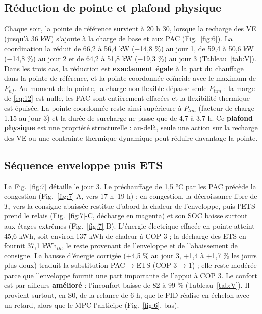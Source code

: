 \documentclass[conference]{IEEEtran}
\begin{document}
\subsection{Réduction de pointe et plafond physique}

Chaque soir, la pointe de référence survient à 20 h 30, lorsque la recharge des VE (jusqu'à 36 kW) s'ajoute à la charge de base et aux PAC (Fig.~\ref{fig:6}). La coordination la réduit de 66,2 à 56,4 kW (−14,8 \%) au jour 1, de 59,4 à 50,6 kW (−14,8 \%) au jour 2 et de 64,2 à 51,8 kW (−19,3 \%) au jour 3 (Tableau~\ref{tab:V}). Dans les trois cas, la réduction est \textbf{exactement égale} à la part du chauffage dans la pointe de référence, et la pointe coordonnée coïncide avec le maximum de \(P_{nf}\). Au moment de la pointe, la charge non flexible dépasse seule \(P_{lim}\) : la marge de \eqref{eq:12} est nulle, les PAC sont entièrement effacées et la flexibilité thermique est épuisée. La pointe coordonnée reste ainsi supérieure à \(P_{lim}\) (facteur de charge 1,15 au jour 3) et la durée de surcharge ne passe que de 4,7 à 3,7 h. Ce \textbf{plafond physique} est une propriété structurelle : au-delà, seule une action sur la recharge des VE ou une contrainte thermique dynamique peut réduire davantage la pointe.

\subsection{Séquence enveloppe puis ETS}

La Fig.~\ref{fig:7} détaille le jour 3. Le préchauffage de 1,5 °C par les PAC précède la congestion (Fig.~\ref{fig:7}-A, vers 17 h--19 h) ; en congestion, la décroissance libre de \(T_i\) vers la consigne abaissée restitue d'abord la chaleur de l'enveloppe, puis l'ETS prend le relais (Fig.~\ref{fig:7}-C, décharge en magenta) et son SOC baisse surtout aux étages extrêmes (Fig.~\ref{fig:7}-B). L'énergie électrique effacée en pointe atteint 45,6 kWh, soit environ 137 kWh de chaleur à COP 3 ; la décharge des ETS en fournit 37,1 kWh\(_{th}\), le reste provenant de l'enveloppe et de l'abaissement de consigne. La hausse d'énergie corrigée (+4,5 \% au jour 3, +1,4 à +1,7 \% les jours plus doux) traduit la substitution PAC → ETS (COP 3 → 1) ; elle reste modérée parce que l'enveloppe fournit une part importante de l'appui à COP 3. Le confort est par ailleurs \textbf{amélioré} : l'inconfort baisse de 82 à 99 \% (Tableau~\ref{tab:V}). Il provient surtout, en S0, de la relance de 6 h, que le PID réalise en échelon avec un retard, alors que le MPC l'anticipe (Fig.~\ref{fig:6}, bas).
\end{document}
